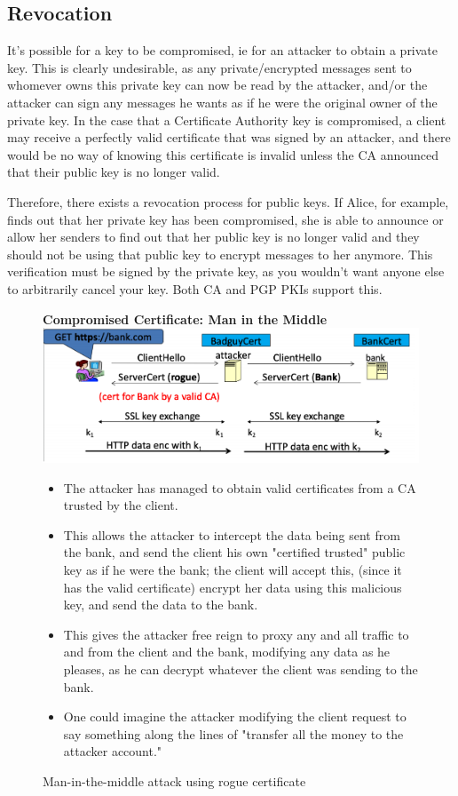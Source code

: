 \documentclass[11pt]{article} %
\begin{document}
\subsection{Revocation}
It's possible for a key to be compromised, ie for an attacker to obtain a private key. This is clearly undesirable, as any private/encrypted messages sent to whomever owns this private key can now be read by the attacker, and/or the attacker can sign any messages he wants as if he were the original owner of the private key. In the case that a Certificate Authority key is compromised, a client may receive a perfectly valid certificate that was signed by an attacker, and there would be no way of knowing this certificate is invalid unless the CA announced that their public key is no longer valid.

\bigskip
Therefore, there exists a revocation process for public keys. If Alice, for example, finds out that her private key has been compromised, she is able to announce or allow her senders to find out that her public key is no longer valid and they should not be using that public key to encrypt messages to her anymore. This verification must be signed by the private key, as you wouldn't want anyone else to arbitrarily cancel your key. Both CA and PGP PKIs support this. 
\newpage
\begin{figure}
    \centering
    \textbf{Compromised Certificate: Man in the Middle}
    \includegraphics[scale=.4]{./cert3.png}
    \caption{Man-in-the-middle attack using rogue certificate}
    \begin{itemize}
      \item The attacker has managed to obtain valid certificates from a CA trusted by the client.
      \item This allows the attacker to intercept the data being sent from the bank, and send the client his own "certified trusted" public key as if he were the bank; the client will accept this, (since it has the valid certificate) encrypt her data using this malicious key, and send the data to the bank.
      \item This gives the attacker free reign to proxy any and all traffic to and from the client and the bank, modifying any data as he pleases, as he can decrypt whatever the client was sending to the bank.
      \item One could imagine the attacker modifying the client request to say something along the lines of "transfer all the money to the attacker account." 
    \end{itemize}
\end{figure}
\end{document}

